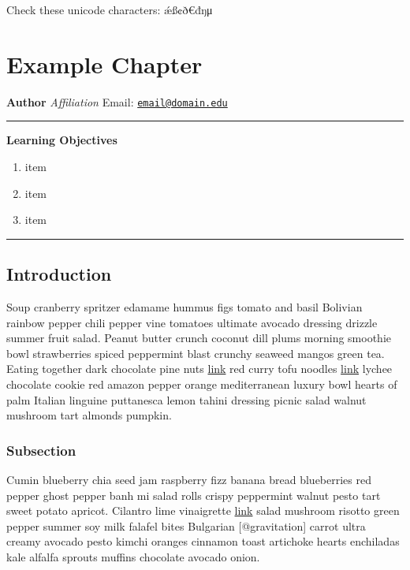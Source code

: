 \documentclass{book}
\providecommand{\tightlist}{%
  \setlength{\itemsep}{0pt}\setlength{\parskip}{0pt}}
\begin{document}
Check these unicode characters: ǽß¢ð€đŋμ

\hypertarget{example-chapter}{%
\chapter{Example Chapter}\label{example-chapter}}

\textbf{Author} \emph{Affiliation} Email:
\href{mailto:email@domain.edu}{\nolinkurl{email@domain.edu}}

\begin{center}\rule{0.5\linewidth}{0.5pt}\end{center}

\textbf{Learning Objectives}

\begin{enumerate}
\def\labelenumi{\arabic{enumi}.}
\tightlist
\item
  item
\item
  item
\item
  item
\end{enumerate}

\begin{center}\rule{0.5\linewidth}{0.5pt}\end{center}

\hypertarget{introduction-1}{%
\section{Introduction}\label{introduction-1}}

Soup cranberry spritzer edamame hummus figs tomato and basil Bolivian rainbow
pepper chili pepper vine tomatoes ultimate avocado dressing drizzle summer
fruit salad. Peanut butter crunch coconut dill plums morning smoothie bowl
strawberries spiced peppermint blast crunchy seaweed mangos green tea. Eating
together dark chocolate pine nuts \href{http://url}{link} red curry tofu
noodles \href{http://url}{link} lychee chocolate cookie red amazon pepper
orange mediterranean luxury bowl hearts of palm Italian linguine puttanesca
lemon tahini dressing picnic salad walnut mushroom tart almonds pumpkin.

\hypertarget{subsection}{%
\subsection{Subsection}\label{subsection}}

Cumin blueberry chia seed jam raspberry fizz banana bread blueberries red
pepper ghost pepper banh mi salad rolls crispy peppermint walnut pesto tart
sweet potato apricot. Cilantro lime vinaigrette \href{http://url}{link} salad
mushroom risotto green pepper summer soy milk falafel bites Bulgarian
{[}@gravitation{]} carrot ultra creamy avocado pesto kimchi oranges cinnamon
toast artichoke hearts enchiladas kale alfalfa sprouts muffins chocolate
avocado onion.
\end{document}
